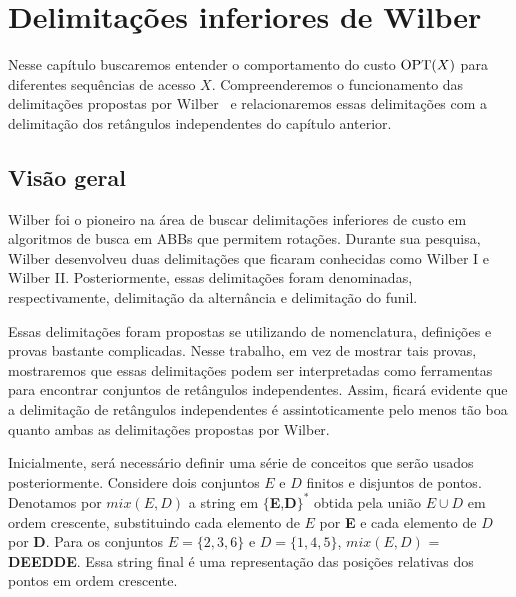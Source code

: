 
\chapter{Delimitações inferiores de Wilber}
\label{cap:wilber}

\newcommand{\cT}{\mathcal{T}}

Nesse capítulo buscaremos entender o comportamento do custo $\mathrm{OPT}(X)$ para diferentes sequências de acesso $X$. Compreenderemos o funcionamento das delimitações propostas por Wilber~\cite{lowerbound_wilber} e relacionaremos essas delimitações com a delimitação dos retângulos independentes do capítulo anterior.

\section{Visão geral} \label{sec:visao_geral}

Wilber foi o pioneiro na área de buscar delimitações inferiores de custo em algoritmos de busca em ABBs que permitem rotações. Durante sua pesquisa, Wilber desenvolveu duas delimitações que ficaram conhecidas como Wilber I e Wilber II. Posteriormente, essas delimitações foram denominadas, respectivamente, delimitação da alternância e delimitação do funil. 

Essas delimitações foram propostas se utilizando de nomenclatura, definições e provas bastante complicadas. Nesse trabalho, em vez de mostrar tais provas, mostraremos que essas delimitações podem ser interpretadas como ferramentas para encontrar conjuntos de retângulos independentes. Assim, ficará evidente que a delimitação de retângulos independentes é assintoticamente pelo menos tão boa quanto ambas as delimitações propostas por Wilber.

Inicialmente, será necessário definir uma série de conceitos que serão usados posteriormente.
Considere dois conjuntos $E$ e $D$ finitos e disjuntos de pontos. Denotamos por $mix(E,D)$ a string em $\{$\textbf{E},\textbf{D}$\}^{*}$ obtida pela união $E \cup D$ em ordem crescente, substituindo cada elemento de $E$ por \textbf{E} e cada elemento de $D$ por \textbf{D}. Para os conjuntos $E = \{2,3,6\}$ e $D = \{1,4,5\}$, $mix(E,D)$ = \textbf{DEEDDE}. Essa string final é uma representação das posições relativas dos pontos em ordem crescente.


